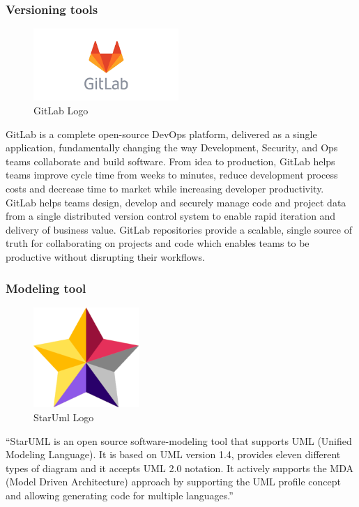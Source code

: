 \documentclass[]{report}
\begin{document}
\subsubsection{Versioning tools}
\begin{figure}
	\includegraphics[width=5.5cm]{gitlab}
	\caption{GitLab Logo}
\end{figure} 

GitLab is a complete open-source DevOps platform, delivered as a single application, fundamentally changing the way Development, Security, and Ops teams collaborate and build software. From idea to production, GitLab helps teams improve cycle time from weeks to minutes, reduce development process costs and decrease time to market while increasing developer productivity.
GitLab helps teams design, develop and securely manage code and project data from a single distributed version control system to enable rapid iteration and delivery of business value. GitLab repositories provide a scalable, single source of truth for collaborating on projects and code which enables teams to be productive without disrupting their workflows.


\subsubsection{Modeling tool}


\begin{figure}
	\includegraphics[width=4cm]{Staruml}
	\caption{StarUml Logo}
\end{figure} 


“StarUML is an open source software-modeling tool that supports UML (Unified Modeling Language). It is based on UML version 1.4, provides eleven different types of diagram and it accepts UML 2.0 notation. It actively supports the MDA (Model Driven Architecture) approach by supporting the UML profile concept and allowing generating code for multiple languages.”  \\\\\\\\\par
\end{document}
